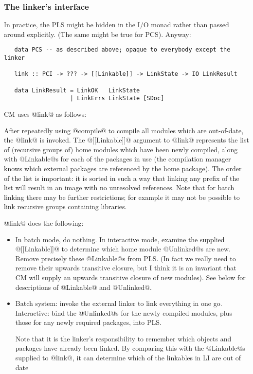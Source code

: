 \documentclass[11pt]{article}
\begin{document}
\subsubsection{The linker's interface}

In practice, the PLS might be hidden in the I/O monad rather
than passed around explicitly.  (The same might be true for PCS).
Anyway:

\begin{verbatim}
   data PCS -- as described above; opaque to everybody except the linker

   link :: PCI -> ??? -> [[Linkable]] -> LinkState -> IO LinkResult

   data LinkResult = LinkOK   LinkState
                   | LinkErrs LinkState [SDoc]
\end{verbatim}

CM uses @link@ as follows:

After repeatedly using @compile@ to compile all modules which are
out-of-date, the @link@ is invoked.  The @[[Linkable]]@ argument to
@link@ represents the list of (recursive groups of) home modules which
have been newly compiled, along with @Linkable@s for each of
the packages in use (the compilation manager knows which external
packages are referenced by the home package).  The order of the list
is important: it is sorted in such a way that linking any prefix of
the list will result in an image with no unresolved references.  Note
that for batch linking there may be further restrictions; for example
it may not be possible to link recursive groups containing libraries.

@link@ does the following:

\begin{itemize}
  \item 
  In batch mode, do nothing.  In interactive mode,
  examine the supplied @[[Linkable]]@ to determine which home 
  module @Unlinked@s are new.  Remove precisely these @Linkable@s 
  from PLS.  (In fact we really need to remove their upwards
  transitive closure, but I think it is an invariant that CM will
  supply an upwards transitive closure of new modules).
  See below for descriptions of @Linkable@ and @Unlinked@.

  \item 
  Batch system: invoke the external linker to link everything in one go.
  Interactive: bind the @Unlinked@s for the newly compiled modules,
  plus those for any newly required packages, into PLS.

  Note that it is the linker's responsibility to remember which
  objects and packages have already been linked.  By comparing this
  with the @Linkable@s supplied to @link@, it can determine which
  of the linkables in LI are out of date
\end{itemize}
\end{document}
